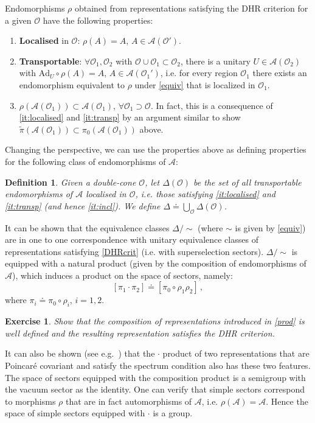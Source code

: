 \documentclass[12pt]{article}
\newcommand{\1}{\mathds{1}}                         %
\newcommand{\Ocal}{\mathcal{O}}
\newcommand{\Ac}{{\mathcal{A}}}
\newcommand{\be}{\begin{equation}}
\newcommand{\ee}{\end{equation}}
\newtheorem{exercise}[theorem]{Exercise}
\newtheorem{df}[theorem]{Definition}}
\begin{document}
Endomorphisms $\rho$ obtained from representations satisfying the DHR criterion for a given $\Ocal$ have the following properties: \cite{KlausSuperselection}
	\begin{enumerate}[label=\bf LE\arabic{enumi},leftmargin=*,widest=4] 
	\item \textbf{Localised} in $\Ocal$: $\rho(A)=A$, $A\in\Ac(\Ocal')$.\label{it:localised}
	\item \textbf{Transportable}: $\forall \Ocal_1,\Ocal_2$ with $\Ocal\cup\Ocal_1\subset \Ocal_2$, there is a unitary $U\in \Ac(\Ocal_2)$ with $\mathrm{Ad}_U\circ\rho(A)=A$, $A\in\Ac(\Ocal_1')$, i.e. for every region $\Ocal_1$ there exists an endomorphism equivalent to $\rho$  under \eqref{equiv} that is localized in $\Ocal_1$. \label{it:transp}
	\item $\rho(\Ac(\Ocal_1))\subset \Ac(\Ocal_1)$, $\forall \Ocal_1\supset\Ocal$.  In fact, this is a consequence of \ref{it:localised} and \ref{it:transp} by an argument similar to show $\tilde{\pi}(\Ac(\Ocal_1))\subset \pi_0(\Ac(\Ocal_1))$ above. \label{it:incl}
\end{enumerate}
Changing the perspective, we can use the properties above  
as defining properties for the following class of endomorphisms of $\Ac$:
\begin{df}
	Given a double-cone $\Ocal$, let $\Delta(\Ocal)$ be the set of all transportable endomorphisms of $\Ac$ localised in $\Ocal$, i.e.  those satisfying \ref{it:localised} and \ref{it:transp} (and hence \ref{it:incl}). We define
	 $\Delta\doteq \bigcup_\Ocal \Delta(\Ocal)$. 
\end{df}
It can be shown that the equivalence classes $\Delta/\sim$ (where $\sim$ is given by \eqref{equiv}) are in one to one correspondence with unitary equivalence classes of representations satisfying \eqref{DHRcrit} (i.e. with superselection sectors).  $\Delta/\sim$ is equipped with a natural product (given by the composition of endomorphisms of $\Ac$), which induces a product on the space of sectors, namely:
	\be\label{prod}
	[\pi_1\cdot \pi_2]\doteq [\pi_0\circ \rho_1\rho_2]\,,
	\ee
	where $\pi_i\doteq \pi_0\circ \rho_i$, $i=1,2$.
\begin{exercise}
	Show that the composition of representations introduced in \eqref{prod} is well defined and the resulting representation satisfies the DHR criterion.
\end{exercise}
It can also be shown (see e.g.~\cite{KlausSuperselection}) that the $\cdot$ product of two representations that are Poincar\'e covariant and satisfy the spectrum condition also has these two features. The space of sectors  equipped with the composition product is a semigroup with the vacuum sector as the identity. One can verify that simple sectors correspond to morphisms $\rho$ that are in fact automorphisms of $\Ac$, i.e. $\rho(\Ac)=\Ac$. Hence the space of simple sectors equipped with $\cdot$ is a group. 
\end{document}
